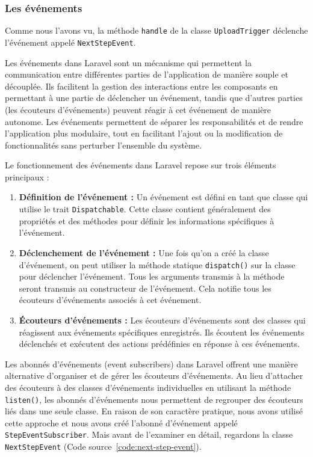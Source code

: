 \subsubsection{Les événements}

Comme nous l'avons vu, la méthode \Verb|handle| de la classe \Verb|UploadTrigger| déclenche l'événement appelé \Verb|NextStepEvent|.

Les événements dans Laravel sont un mécanisme qui permettent la communication entre différentes parties de l'application de manière souple et découplée. Ils facilitent la gestion des interactions entre les composants en permettant à une partie de déclencher un événement, tandis que d'autres parties (les écouteurs d'événements) peuvent réagir à cet événement de manière autonome. Les événements permettent de séparer les responsabilités et de rendre l'application plus modulaire, tout en facilitant l'ajout ou la modification de fonctionnalités sans perturber l'ensemble du système.

Le fonctionnement des événements dans Laravel repose sur trois éléments principaux :

\begin{enumerate}
    \item \textbf{Définition de l'événement :} Un événement est défini en tant que classe qui utilise le trait \Verb|Dispatchable|. Cette classe contient généralement des propriétés et des méthodes pour définir les informations spécifiques à l'événement.
    \item \textbf{Déclenchement de l'événement :} Une fois qu'on a créé la classe d'événement, on peut utiliser la méthode statique \Verb|dispatch()| sur la classe pour déclencher l'événement. Tous les arguments transmis à la méthode seront transmis au constructeur de l'événement. Cela notifie tous les écouteurs d'événements associés à cet événement.
    \item \textbf{Écouteurs d'événements :} Les écouteurs d'événements sont des classes qui réagissent aux événements spécifiques enregistrés. Ils écoutent les événements déclenchés et exécutent des actions prédéfinies en réponse à ces événements.
\end{enumerate}

Les abonnés d'événements (event subscribers) dans Laravel offrent une manière alternative d'organiser et de gérer les écouteurs d'événements. Au lieu d'attacher des écouteurs à des classes d'événements individuelles en utilisant la méthode \Verb|listen()|, les abonnés d'événements nous permettent de regrouper des écouteurs liés dans une seule classe. En raison de son caractère pratique, nous avons utilisé cette approche et nous avons créé l'abonné d'événement appelé \Verb|StepEventSubscriber|. Mais avant de l'examiner en détail, regardons la classe \Verb|NextStepEvent| (Code source~\ref{code:next-step-event}).

